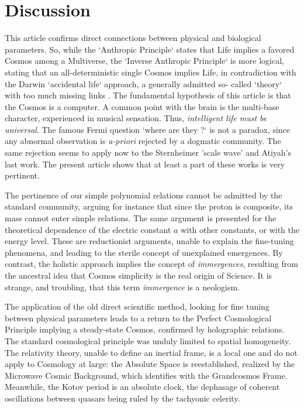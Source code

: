 \documentclass[twoside,draft]{article}
\begin{document}
\begin{sloppypar}
\section {Discussion}

This article confirms direct connections \cite{Sanchez1} between physical and biological parameters. So,
while the `Anthropic Principle` states that Life implies a favored Cosmos among a Multiverse, the
`Inverse Anthropic Principle` is more logical, stating that an all-deterministic single Cosmos
implies Life, in contradiction with the Darwin `accidental life` approach, a generally admitted so-
called `theory` with too much missing links \cite{Chauvin}. The fundamental hypothesis of
this article is that the Cosmos is a computer. A common point with the brain is the multi-base
character, experienced in musical sensation. Thus, \textit{intelligent life must be universal}. The famous Fermi
question `where are they ?` is not a paradox, since any abnormal observation is \textit{a-priori} rejected by a
dogmatic community. The same rejection seems to apply now to the Sternheimer 'scale wave' and Atiyah's last work. The present article shows that at least a part of these works is very pertinent.

The pertinence of our simple polynomial relations cannot be admitted by the standard community, arguing for instance that since the proton is composite, its mass cannot enter simple relations. The same argument is presented for the theoretical dependence of the electric constant $a$ with other constants, or with the energy level. These are reductionist arguments, unable to explain the fine-tuning phenomena, and leading to the sterile concept of unexplained emergences. By contrast, the holistic approach implies the concept of \textit{immergences}, resulting from the ancestral idea that Cosmos simplicity is the real origin of Science. It is strange, and troubling, that this term \textit{immergence} is a neologism.

The application of the old direct scientific method, looking for fine tuning between physical
parameters leads to a return to the Perfect Cosmological Principle implying a steady-state Cosmos,
confirmed by holographic relations. The standard cosmological principle was unduly limited to
spatial homogeneity. The relativity theory, unable to define an inertial frame, is a local one and do
not apply to Cosmology at large: the Absolute Space is reestablished, realized by the Microwave
Cosmic Background, which identifies with the Grandcosmos Frame. Meanwhile, the Kotov period is an
absolute clock, the dephasage of coherent oscillations between quasars being ruled by the tachyonic celerity.


\end{sloppypar}
\end{document}

